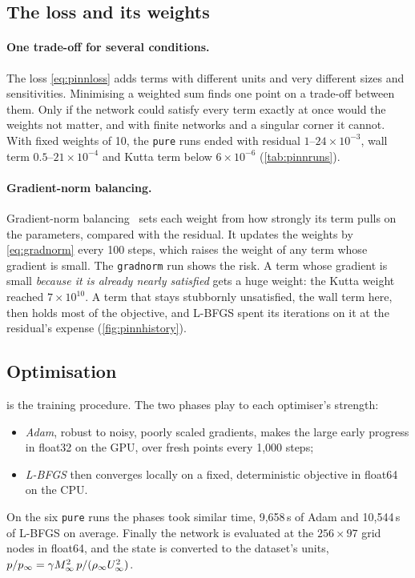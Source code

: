 \subsection{The loss and its weights}

\paragraph{One trade-off for several conditions.}
The loss \cref{eq:pinnloss} adds terms with different units and very different sizes and
sensitivities. Minimising a weighted sum finds one point on a trade-off between them. Only if the
network could satisfy every term exactly at once would the weights not matter, and with finite
networks and a singular corner it cannot. With fixed weights of 10, the \texttt{pure} runs ended
with residual $1$--$24\times10^{-3}$, wall term $0.5$--$21\times10^{-4}$ and Kutta term below
$6\times10^{-6}$ (\cref{tab:pinnruns}).

\paragraph{Gradient-norm balancing.}
Gradient-norm balancing~\cite{wang2021gradient} sets each weight from how strongly its term
pulls on the parameters, compared with the residual. It updates the weights by
\cref{eq:gradnorm} every 100 steps, which raises the weight of any term whose gradient is small.
The \texttt{gradnorm} run shows the risk. A term whose gradient is small \emph{because it is
already nearly satisfied} gets a huge weight: the Kutta weight reached $7\times10^{10}$. A term
that stays stubbornly unsatisfied, the wall term here, then holds most of the objective, and
L-BFGS spent its iterations on it at the residual's expense (\cref{fig:pinnhistory}).

\subsection{Optimisation}

 is the training procedure. The two phases play to each optimiser's strength:
\begin{itemize}
  \item \emph{Adam}, robust to noisy, poorly scaled gradients, makes the large early progress in
    float32 on the GPU, over fresh points every 1,000 steps;
  \item \emph{L-BFGS} then converges locally on a fixed, deterministic objective in float64 on the
    CPU.
\end{itemize}
On the six \texttt{pure} runs the phases took similar time, 9,658\,s of Adam and 10,544\,s of
L-BFGS on average. Finally the network is evaluated at the $256\times97$ grid nodes in float64, and
the state is converted to the dataset's units, $p/p_\infty = \gamma M_\infty^2\,p/(\rho_\infty U_\infty^2)$.

